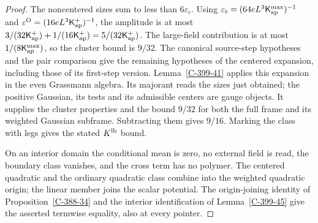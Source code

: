 \documentclass[11pt,letterpaper,reqno]{amsart}
\theoremstyle{definition}
\theoremstyle{remark}
\begin{document}
\begin{proof}
The noncentered sizes sum to less than $6\varepsilon_\flat$.
Using $\varepsilon_\flat=(64eL^3\mathsf K_{\rm ap}^{\max})^{-1}$
and $\varepsilon^{\rm O}=(16eL^3\mathsf K_{\rm ap}^{+})^{-1}$,
the amplitude is at most
$3/(32\mathsf K_{\rm ap}^+)+1/(16\mathsf K_{\rm ap}^+)
=5/(32\mathsf K_{\rm ap}^+)$. The large-field contribution
is at most $1/(8\mathsf K_{\rm ap}^{\max})$, so the cluster
bound is $9/32$. The canonical source-step hypotheses and the
pair comparison give the remaining hypotheses of the centered
expansion, including those of its first-step version.
Lemma~\ref{C-399-41} applies this expansion in the even
Grassmann algebra. Its majorant reads the sizes just obtained;
the positive Gaussian, its tests and its admissible centers
are gauge objects. It supplies the cluster properties and the
bound $9/32$ for both the full frame and its weighted Gaussian
subframe. Subtracting them gives $9/16$. Marking the class
with legs gives the stated $K^{\rm lb}$ bound.

On an interior domain the conditional mean is zero, no external
field is read, the boundary class vanishes, and the cross term
has no polymer. The centered quadratic and the ordinary
quadratic class combine into the weighted quadratic origin;
the linear member joins the scalar potential. The origin-joining
identity of Proposition~\ref{C-388-34} and the interior
identification of Lemma~\ref{C-399-45} give the asserted
termwise equality, also at every pointer.
\end{proof}
\end{document}
